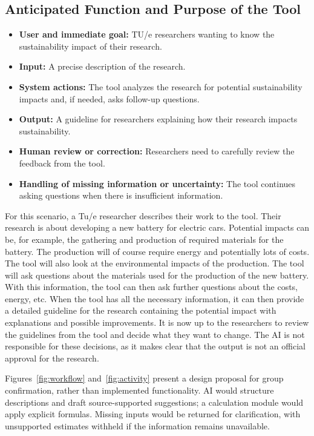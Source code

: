 \documentclass[11pt,a4paper]{article}
\begin{document}
\FloatBarrier
\subsection{Anticipated Function and Purpose of the Tool}
\begin{itemize}
    \item \textbf{User and immediate goal:} TU/e researchers wanting to know the sustainability impact of their research.
    
    \item \textbf{Input:} A precise description of the research.
    
    \item \textbf{System actions:} The tool analyzes the research for potential sustainability impacts and, if needed, asks follow-up questions.
    
    \item \textbf{Output:} A guideline for researchers explaining how their research impacts sustainability.
    
    \item \textbf{Human review or correction:} Researchers need to carefully review the feedback from the tool.
    
    \item \textbf{Handling of missing information or uncertainty:} The tool continues asking questions when there is insufficient information.
\end{itemize} 

For this scenario, a Tu/e researcher describes their work to the tool. Their research is about developing a new battery for electric cars. 
Potential impacts can be, for example, the gathering and production of required materials for the battery. The production will of course require energy and potentially lots of costs. The tool will also look at the environmental impacts of the production.
The tool will ask questions about the materials used for the production of the new battery. With this information, the tool can then ask further questions about the costs, energy, etc. 
When the tool has all the necessary information, it can then provide a detailed guideline for the research containing the potential impact with explanations and possible improvements. 
It is now up to the researchers to review the guidelines from the tool and decide what they want to change. The AI is not responsible for these decisions, as it makes clear that the output is not an official approval for the research.


Figures~\ref{fig:workflow} and~\ref{fig:activity} present a design proposal for group confirmation, rather than implemented functionality. AI would structure descriptions and draft source-supported suggestions; a calculation module would apply explicit formulas. Missing inputs would be returned for clarification, with unsupported estimates withheld if the information remains unavailable.
\end{document}
